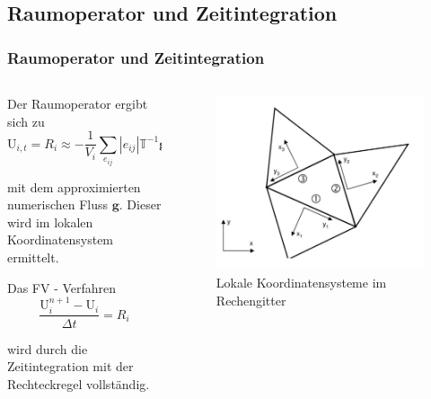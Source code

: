 \documentclass[
	11pt, %
	aspectratio=169, %
]{beamer}
\begin{document}
\subsection{Raumoperator und Zeitintegration}
\begin{frame}
	\frametitle{Raumoperator und Zeitintegration}
	\begin{columns}[c] %
		\begin{column}{0.6\textwidth} %
			Der Raumoperator ergibt sich zu
			\begin{equation}
				\mathrm{U}_{i,t} = R_i \approx -\frac{1}{V_i} \sum\limits_{e_{ij}}^{} |e_{ij}| \mathbb{T}^{-1} \mathbf{g}(\mathbb{T}\mathrm{U}_i,\: \mathbb{T}\mathrm{U}_j; \: [1,0]^\intercal)
			\end{equation}
		
			mit dem approximierten numerischen Fluss $\mathbf{g}$. Dieser wird im lokalen Koordinatensystem ermittelt.
			
		
			Das FV - Verfahren
			\begin{equation}
				\frac{\mathrm{U}_i^{n+1}-\mathrm{U}_i}{\Delta t} = R_i
			\end{equation}
		
			wird durch die Zeitintegration mit der Rechteckregel vollständig.
		\end{column}
		\begin{column}{0.35\textwidth} %
			\vspace*{-1cm}
			\begin{figure}
				\includegraphics[width=1.1\linewidth]{local_global.JPG}
				\caption{Lokale Koordinatensysteme im Rechengitter}
			\end{figure}
		\end{column}
	\end{columns}
	
	
	
 


\end{frame}
\end{document}
